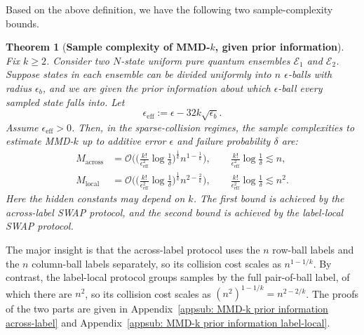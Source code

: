 \documentclass[aps,prx,reprint,superscriptaddress,amsmath,amssymb,longbibliography,floatfix]{revtex4-2}
\newcommand{\scE}{\mathcal{E}}
\newcommand{\scO}{\mathcal{O}}
\theoremstyle{plain}
\newtheorem{theorem}{Theorem}[section]
\theoremstyle{definition}
\theoremstyle{remark}
\begin{document}
Based on the above definition, we have the following two sample-complexity bounds.
\begin{theorem}[\textbf{Sample complexity of MMD-$k$, given prior information}]
    \label{thm: sample complexity MMD-k, prior information}
    Fix $k\ge2$. Consider two $N$-state uniform pure quantum ensembles $\scE_1$ and $\scE_2$. Suppose states in each ensemble can be divided uniformly into $n$ $\epsilon$-balls with radius $\epsilon_b$, and we are given the prior information about which $\epsilon$-ball every sampled state falls into. Let
    \begin{equation}
        \epsilon_{\mathrm{eff}}
        :=
        \epsilon-32k\sqrt{\epsilon_b}.
    \end{equation}
    Assume $\epsilon_{\mathrm{eff}}>0$. Then, in the sparse-collision regimes, the sample complexities to estimate MMD-$k$ up to additive error $\epsilon$ and failure probability $\delta$ are:
    \begin{align}
        M_{\mathrm{across}}
        &=
        \scO\Bigg(
        \bigg(
            \frac{k!}{\epsilon_{\mathrm{eff}}^2}
            \log\frac{1}{\delta}
        \bigg)^{\frac1k}
        n^{1-\frac1k}
        \Bigg),
        \qquad
        \frac{k!}{\epsilon_{\mathrm{eff}}^2}\log\frac1\delta \lesssim n,
        \label{eq: M of MMD-k, epsilon ball, across upper bound}\\
        M_{\mathrm{local}}
        &=
        \scO\Bigg(
        \bigg(
            \frac{k!}{\epsilon_{\mathrm{eff}}^2}
            \log\frac{1}{\delta}
        \bigg)^{\frac1k}
        n^{2-\frac2k}
        \Bigg),
        \qquad
        \frac{k!}{\epsilon_{\mathrm{eff}}^2}\log\frac1\delta \lesssim n^2 .
        \label{eq: M of MMD-k, epsilon ball, local upper bound}
    \end{align}
    Here the hidden constants may depend on $k$. The first bound is achieved by the across-label SWAP protocol, and the second bound is achieved by the label-local SWAP protocol.
\end{theorem}

The major insight is that the across-label protocol uses the $n$ row-ball labels and the $n$ column-ball labels separately, so its collision cost scales as $n^{1-1/k}$. By contrast, the label-local protocol groups samples by the full pair-of-ball label, of which there are $n^2$, so its collision cost scales as $(n^2)^{1-1/k}=n^{2-2/k}$. The proofs of the two parts are given in Appendix~\ref{appsub: MMD-k prior information across-label} and Appendix~\ref{appsub: MMD-k prior information label-local}.
\end{document}
